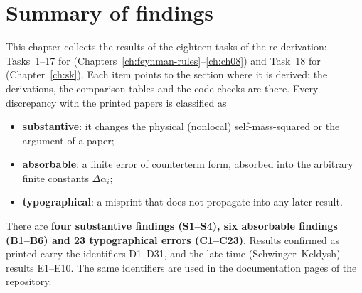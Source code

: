 \chapter{Summary of findings}
\label{ch:summary}

This chapter collects the results of the eighteen tasks of the re-derivation: Tasks~1--17 for \PI{}
(Chapters~\ref{ch:feynman-rules}--\ref{ch:ch08}) and Task~18 for \PII{} (Chapter~\ref{ch:sk}).
Each item points to the section where it is derived; the derivations, the comparison tables and the code checks are there.
Every discrepancy with the printed papers is classified as
\begin{itemize}[leftmargin=14pt,itemsep=1pt]
\item \textbf{substantive}: it changes the physical (nonlocal) self-mass-squared or the argument of a paper;
\item \textbf{absorbable}: a finite error of counterterm form, absorbed into the arbitrary finite constants $\Delta\alpha_i$;
\item \textbf{typographical}: a misprint that does not propagate into any later result.
\end{itemize}
There are \textbf{four substantive findings (S1--S4), six absorbable findings (B1--B6) and 23 typographical errors (C1--C23)}.
Results confirmed as printed carry the identifiers D1--D31, and the late-time (Schwinger--Keldysh) results E1--E10.
The same identifiers are used in the documentation pages of the repository.


